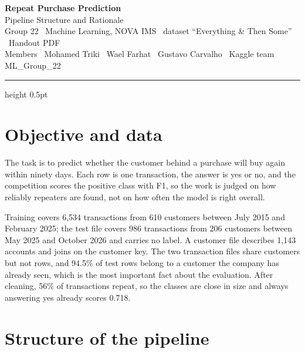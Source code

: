 \documentclass[11pt,a4paper]{article}
\begin{document}
\begin{center}
{\Large\bfseries Repeat Purchase Prediction}\\[2pt]
{\normalsize Pipeline Structure and Rationale}\\[5pt]
{\small Group 22 \textbullet\ Machine Learning, NOVA IMS \textbullet\ dataset ``Everything \& Then Some'' \textbullet\ Handout PDF}\\[4pt]
{\small Members \textbullet\ Mohamed Triki \textbullet\ Wael Farhat \textbullet\ Gustavo Carvalho \textbullet\ Kaggle team ML\_Group\_22}\\[6pt]
\hrule height 0.5pt
\end{center}
\vspace{6pt}

\section{Objective and data}

The task is to predict whether the customer behind a purchase will buy again within ninety days. Each row is
one transaction, the answer is yes or no, and the competition scores the positive class with F1, so the work is
judged on how reliably repeaters are found, not on how often the model is right overall.

Training covers 6{,}534 transactions from 610 customers between July 2015 and February 2025; the test file
covers 986 transactions from 206 customers between May 2025 and October 2026 and carries no label. A customer
file describes 1{,}143 accounts and joins on the customer key. The two transaction files share customers but not
rows, and 94.5\% of test rows belong to a customer the company has already seen, which is the most important
fact about the evaluation. After cleaning, 56\% of transactions repeat, so the classes are close in size and
always answering yes already scores 0.718.

\section{Structure of the pipeline}
\end{document}
